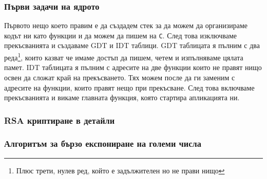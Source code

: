 \subsubsection{Първи задачи на ядрото}
Първото нещо което правим е да създадем стек за да можем да организираме кодът ни като функции и да можем да пишем на {\tt C}. След това изключваме прекъсванията и създаваме GDT и IDT таблици. GDT таблицата я пълним с два реда\footnote{Плюс трети, нулев ред, който е задължителен но не прави нищо}, които казват че имаме достъп да пишем, четем и изпълняваме цялата памет. IDT таблицата я пълним с адресите на две функции които не правят нищо освен да сложат край на прекъсването. Тях можем после да ги заменим с адресите на функции, които правят нещо при прекъсване. След това включваме прекъсванията и викаме главната функция, която стартира апликацията ни.

\subsubsection{RSA криптиране в детайли}

\subsubsection{Алгоритъм за бързо експониране на големи числа}
